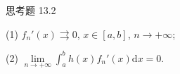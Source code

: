 \begin{exblock}{思考题 13.2}
\begin{enumerate}
  (1) $f_{n}'(x)\rightrightarrows0$, $x\in[a,b]$, $n\to+\infty$;

  (2) $\lim\limits_{n\to+\infty}\int_{a}^{b}h(x)f_{n}'(x)\mathrm{d}x=0$.
\end{enumerate}
\end{exblock}
